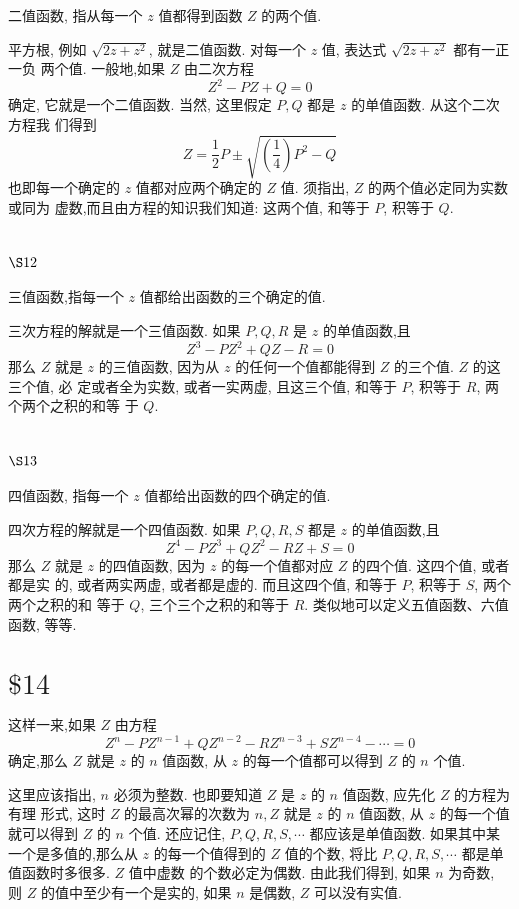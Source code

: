 二值函数, 指从每一个 $z$ 值都得到函数 $Z$ 的两个值.

平方根, 例如 $\sqrt{2 z+z^{2}}$, 就是二值函数. 对每一个 $z$ 值, 表达式 $\sqrt{2 z+z^{2}}$ 都有一正一负 两个值. 一般地,如果 $Z$ 由二次方程
\[
Z^{2}-P Z+Q=0
\]
确定, 它就是一个二值函数. 当然, 这里假定 $P, Q$ 都是 $z$ 的单值函数. 从这个二次方程我 们得到
\[
Z=\frac{1}{2} P \pm \sqrt{\left(\frac{1}{4}\right) P^{2}-Q}
\]
也即每一个确定的 $z$ 值都对应两个确定的 $Z$ 值. 须指出, $Z$ 的两个值必定同为实数或同为 虚数,而且由方程的知识我们知道: 这两个值, 和等于 $P$, 积等于 $Q$.

\section{$\S 12$}

三值函数,指每一个 $z$ 值都给出函数的三个确定的值.

三次方程的解就是一个三值函数. 如果 $P, Q, R$ 是 $z$ 的单值函数,且
\[
Z^{3}-P Z^{2}+Q Z-R=0
\]
那么 $Z$ 就是 $z$ 的三值函数, 因为从 $z$ 的任何一个值都能得到 $Z$ 的三个值. $Z$ 的这三个值, 必 定或者全为实数, 或者一实两虚, 且这三个值, 和等于 $P$, 积等于 $R$, 两个两个之积的和等 于 $Q$.

\section{$\S 13$}

四值函数, 指每一个 $z$ 值都给出函数的四个确定的值.

四次方程的解就是一个四值函数. 如果 $P, Q, R, S$ 都是 $z$ 的单值函数,且
\[
Z^{4}-P Z^{3}+Q Z^{2}-R Z+S=0
\]
那么 $Z$ 就是 $z$ 的四值函数, 因为 $z$ 的每一个值都对应 $Z$ 的四个值. 这四个值, 或者都是实 的, 或者两实两虚, 或者都是虚的. 而且这四个值, 和等于 $P$, 积等于 $S$, 两个两个之积的和 等于 $Q$, 三个三个之积的和等于 $R$. 类似地可以定义五值函数、六值函数, 等等.

\section{$\$ 14$}

这样一来,如果 $Z$ 由方程
\[
Z^{n}-P Z^{n-1}+Q Z^{n-2}-R Z^{n-3}+S Z^{n-4}-\cdots=0
\]
确定,那么 $Z$ 就是 $z$ 的 $n$ 值函数, 从 $z$ 的每一个值都可以得到 $Z$ 的 $n$ 个值.

这里应该指出, $n$ 必须为整数. 也即要知道 $Z$ 是 $z$ 的 $n$ 值函数, 应先化 $Z$ 的方程为有理 形式, 这时 $Z$ 的最高次幂的次数为 $n, Z$ 就是 $z$ 的 $n$ 值函数, 从 $z$ 的每一个值就可以得到 $Z$ 的 $n$ 个值. 还应记住, $P, Q, R, S, \cdots$ 都应该是单值函数. 如果其中某一个是多值的,那么从 $z$ 的每一个值得到的 $Z$ 值的个数, 将比 $P, Q, R, S, \cdots$ 都是单值函数时多很多. $Z$ 值中虚数 的个数必定为偶数. 由此我们得到, 如果 $n$ 为奇数, 则 $Z$ 的值中至少有一个是实的, 如果 $n$ 是偶数, $Z$ 可以没有实值.


